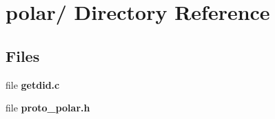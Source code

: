 \section{polar/ Directory Reference}
\label{dir_51fbcad2c72e83a700b4d71702c43de1}
\subsection*{Files}
\begin{CompactItemize}
\item 
file {\bf getdid.c}
\item 
file {\bf proto\_\-polar.h}
\end{CompactItemize}
